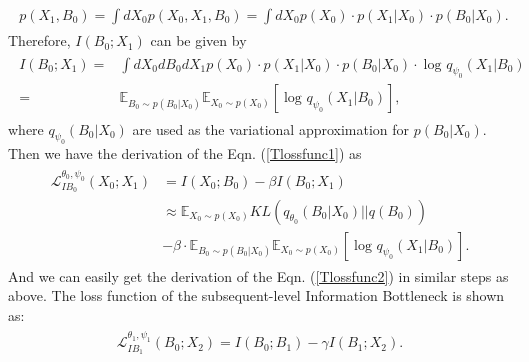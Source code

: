 \begin{align}
\begin{aligned}
p\left ( X_{1}, B_{0} \right ) = \int dX_{0} p\left ( X_{0}, X_{ 1}, B_{0} \right ) = \int dX_0 p\left ( X_0 \right ) \cdot p\left ( X_{ 1}| X_{0}\right ) \cdot p\left ( B_{0}| X_{0} \right ).
\end{aligned}
\label{introduceX0}
\end{align}
Therefore, $I\left ( B_{0}; X_{ 1} \right ) $ can be given by 
\begin{align}
\begin{aligned}
I\left ( B_{0}; X_{ 1} \right ) =& \int dX_{0}dB_{0}dX_{ 1} p\left ( X_0 \right ) \cdot p\left ( X_{ 1}| X_{0}\right ) \cdot p\left ( B_{0}| X_{0} \right )\cdot \log_{}{q_{\psi _{0} }\left (X_{ 1}|B_{0} \right ) } \\=& 
 \mathbb{E} _{B_{0}\sim p(B_{0}|X_{0})}\mathbb{E} _{X_{0}\sim p(X_{0}) }\left [ \log_{}{q_{\psi _{0} } \left ( X_{ 1}|B_{0}  \right )  }   \right ],
\end{aligned}
\end{align}
where $q_{\psi _{0} } \left ( B_{0}|X_{0}\right )$ are used as the variational approximation for $p\left ( B_{0}|X_{0}\right )$. Then we have the derivation of the Eqn. (\ref{Tlossfunc1}) as
\begin{align}
\begin{aligned}
\mathcal{L}_{IB_{0}}^{\theta _{0},\psi _{0} } \left ( X_{0}; X_{ 1} \right ) &= I\left ( X_{0}; B_{0} \right )-\beta I\left ( B_{0}; X_{ 1} \right ) \\
&\approx \mathbb{E} _{X_{0}\sim p(X_{0}) }  KL\left ( q_{\theta _{0}}\left ( B_{0}|X_{0} \right ) ||q\left ( B_{0} \right ) \right )  \\& -\beta\cdot \mathbb{E} _{B_{0}\sim p(B_{0}|X_{0})}\mathbb{E} _{X_{0}\sim p(X_{0}) }\left [ \log_{}{q_{\psi _{0} } \left ( X_{ 1}|B_{0}  \right )  }   \right ].
\end{aligned}
\label{AAlossfunc1}
\end{align}
And we can easily get the derivation of the Eqn. (\ref{Tlossfunc2}) in similar steps as above. The loss function of the subsequent-level Information Bottleneck is shown as: 
\begin{align}
\begin{aligned}
\mathcal{L}_{IB_{ 1}}^{\theta _{ 1},\psi _{ 1} } \left ( B_{0}; X_{ 2} \right ) = I\left ( B_{0}; B_{ 1} \right )-\gamma I\left ( B_{ 1}; X_{ 2} \right ).
\end{aligned}
\label{appeq2_IB}
\end{align}
